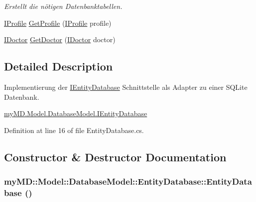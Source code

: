 \begin{CompactItemize}
\begin{CompactList}\small\item\em Erstellt die n\"{o}tigen Datenbanktabellen. \item\end{CompactList}\item 
\hyperlink{interfacemy_m_d_1_1_model_interface_1_1_data_model_interface_1_1_i_profile}{IProfile} \hyperlink{classmy_m_d_1_1_model_1_1_database_model_1_1_entity_database_a22117377d44ffae8e1381d0814d1960}{Get\-Profile} (\hyperlink{interfacemy_m_d_1_1_model_interface_1_1_data_model_interface_1_1_i_profile}{IProfile} profile)
\item 
\hyperlink{interfacemy_m_d_1_1_model_interface_1_1_data_model_interface_1_1_i_doctor}{IDoctor} \hyperlink{classmy_m_d_1_1_model_1_1_database_model_1_1_entity_database_cc41e08b876f7f88b63138dc9ee26aea}{Get\-Doctor} (\hyperlink{interfacemy_m_d_1_1_model_interface_1_1_data_model_interface_1_1_i_doctor}{IDoctor} doctor)
\end{CompactItemize}


\subsection{Detailed Description}
Implementierung der \hyperlink{interfacemy_m_d_1_1_model_1_1_database_model_1_1_i_entity_database}{IEntity\-Database} Schnittstelle als Adapter zu einer SQLite Datenbank. 

\hyperlink{interfacemy_m_d_1_1_model_1_1_database_model_1_1_i_entity_database}{my\-MD.Model.Database\-Model.IEntity\-Database} 



Definition at line 16 of file Entity\-Database.cs.

\subsection{Constructor \& Destructor Documentation}
\hypertarget{classmy_m_d_1_1_model_1_1_database_model_1_1_entity_database_e7a63762a30ee10ba8c323619eccd584}{
\subsubsection[EntityDatabase]{\setlength{\rightskip}{0pt plus 5cm}my\-MD::Model::Database\-Model::Entity\-Database::Entity\-Database ()}}
\label{dd/d77/classmy_m_d_1_1_model_1_1_database_model_1_1_entity_database_e7a63762a30ee10ba8c323619eccd584}


